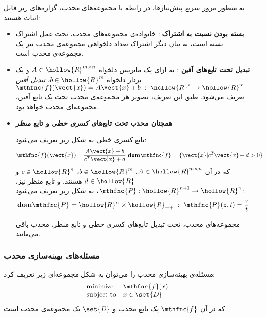 \documentclass[a4paper,11px]{article}
\begin{document}
به منظور مرور سریع پیش‌نیازها، در رابطه با مجموعه‌های محدب، گزاره‌های زیر قابل اثبات هستند:
\begin{itemize}
\item \textbf{
بسته بودن نسبت به اشتراک
}:
خانواده‌ی مجموعه‌های محدب، تحت عمل اشتراک بسته است، به بیان دیگر اشتراک تعداد دلخواهی مجموعه‌ی محدب نیز یک مجموعه‌ی محدب است.

\item \textbf{
تبدیل تحت تابع‌های آفین
}:
به ازای یک ماتریس دلخواه
$A \in \hollow{R}^{m \times n}$
و یک بردار دلخواه
$b \in \hollow{R}^{m}$،
\textit{
تبدیل آفین
}
$\mthfnc{f}( \vect{x} ) = A \vect{x} + b \; : \; \hollow{R}^{n} \rightarrow \hollow{R}^{m}$
تعریف می‌شود. طبق این تعریف، تصویر هر مجموعه‌ی محدب تحت یک تابع آفین، مجموعه‌ای محدب خواهد بود.

\item \textbf{
همچنان محدب تحت تابع‌های
\textit{
کسری خطی
}
و تابع
\textit{
منظر
}
}

تابع کسری خطی به شکل زیر تعریف می‌شود:
\[
\mthfnc{f}( \vect{x} ) = \frac{ A \vect{x} + b }{ c^T \vect{x} + d } \; \mathbf{dom} \mthfnc{f} = \{ \vect{x} | c^T \vect{x} + d > 0 \}
\]
که در آن
$A \in \hollow{R}^{m \times n}$،
$b \in \hollow{R}^m$،
$c \in \hollow{R}^{n}$
و
$d \in \hollow{R}$
هستند. و تابع منظر نیز،
$\mthfnc{P} : \hollow{R}^{n+1} \rightarrow \hollow{R}^n$،
به شکل زیر تعریف می‌شود:
\[
\mathbf{dom} \mthfnc{P} = \hollow{R}^{n} \times \hollow{R}_{++} \; : \; \mthfnc{P}(z,t) = \frac{z}{t}
\]

مجموعه‌های محدب، تحت تبدیل تابع‌های کسری-خطی و تابع منظر، محدب باقی می‌مانند.





\end{itemize}



\subsubsection{
مسئله‌های بهینه‌سازی محدب
}

مسئله‌ی بهینه‌سازی محدب را می‌توان به شکل مجموعه‌ای زیر تعریف کرد:
\[
\begin{array}{ll}
\mbox{minimize} & \mthfnc{f}( x )\\
\mbox{subject to} & x \in \set{D}
\end{array}
\]
که در آن
$\mthfnc{f}$
یک تابع محدب و
$\set{D}$
یک مجموعه‌ی محدب است.
\end{document}
